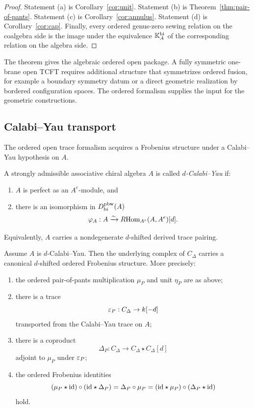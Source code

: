 \begin{proof}
Statement (a) is Corollary~\ref{cor:unit}. Statement (b) is
Theorem~\ref{thm:pair-of-pants}. Statement (c) is
Corollary~\ref{cor:annulus}. Statement (d) is Corollary~\ref{cor:cap}.
Finally, every ordered genus-zero sewing relation on the coalgebra side is the image under the
equivalence $\mathbb{K}_A^{\mathrm{bi}}$ of the corresponding relation on the algebra side.
\end{proof}

\begin{remark}
The theorem gives the algebraic ordered open package. A fully symmetric
one-brane open TCFT requires additional structure that symmetrizes ordered fusion, for example a
boundary symmetry datum or a direct geometric realization by bordered configuration spaces.
The ordered formalism supplies the input for the geometric constructions.
\end{remark}

\subsection{Calabi--Yau transport}

The ordered open trace formalism acquires a Frobenius structure under a Calabi--Yau hypothesis on
$A$.

\begin{definition}
A strongly admissible associative chiral algebra $A$ is called \emph{$d$-Calabi--Yau} if:
\begin{enumerate}[label=(\alph*)]
\item $A$ is perfect as an $A^e$-module, and
\item there is an isomorphism in $D^{\mathrm{pbw}}_{\mathrm{bi}}(A)$
\[
\varphi_A:A\xrightarrow{\sim}R\!\operatorname{Hom}_{A^e}(A,A^e)[d].
\]
\end{enumerate}
Equivalently, $A$ carries a nondegenerate $d$-shifted derived trace pairing.
\end{definition}

\begin{theorem}
\ClaimStatusProvedHere
\label{thm:CY}
Assume $A$ is $d$-Calabi--Yau. Then the underlying complex of $C_\Delta$ carries a canonical
$d$-shifted ordered Frobenius structure. More precisely:
\begin{enumerate}[label=(\roman*)]
\item the ordered pair-of-pants multiplication $\mu_P$ and unit $\eta_P$ are as above;
\item there is a trace
\[
\varepsilon_P:C_\Delta\to k[-d]
\]
transported from the Calabi--Yau trace on $A$;
\item there is a coproduct
\[
\Delta_P:C_\Delta\to C_\Delta\star C_\Delta[d]
\]
adjoint to $\mu_P$ under $\varepsilon_P$;
\item the ordered Frobenius identities
\[
(\mu_P\star \mathrm{id})\circ(\mathrm{id}\star \Delta_P)
=
\Delta_P\circ \mu_P
=
(\mathrm{id}\star\mu_P)\circ(\Delta_P\star \mathrm{id})
\]
hold.
\end{enumerate}
\end{theorem}

